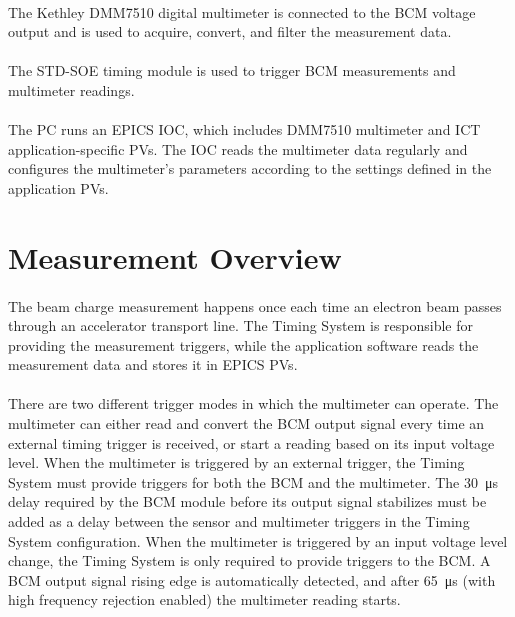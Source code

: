 \documentclass[openany]{article}
\begin{document}
	\paragraph{} The Kethley DMM7510 digital multimeter is connected to the BCM voltage output and is used to acquire, convert, and filter the measurement data.

	\paragraph{} The STD-SOE timing module is used to trigger BCM measurements and multimeter readings.

	\paragraph{} The PC runs an EPICS IOC, which includes DMM7510 multimeter and ICT application-specific PVs. The IOC reads the multimeter data regularly and configures the multimeter's parameters according to the settings defined in the application PVs.

\section{Measurement Overview}

	\paragraph{} The beam charge measurement happens once each time an electron beam passes through an accelerator transport line. The Timing System is responsible for providing the measurement triggers, while the application software reads the measurement data and stores it in EPICS PVs.
	\paragraph{} There are two different trigger modes in which the multimeter can operate. The multimeter can either read and convert the BCM output signal every time an external timing trigger is received, or start a reading based on its input voltage level. When the multimeter is triggered by an external trigger, the Timing System must provide triggers for both the BCM and the multimeter. The \SI{30}{\micro\second} delay required by the BCM module before its output signal stabilizes must be added as a delay between the sensor and multimeter triggers in the Timing System configuration. When the multimeter is triggered by an input voltage level change, the Timing System is only required to provide triggers to the BCM. A BCM output signal rising edge is automatically detected, and after \SI{65}{\micro\second} (with high frequency rejection enabled) the multimeter reading starts.
\end{document}
